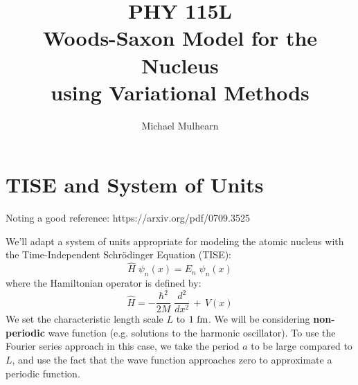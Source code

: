 \documentclass[12pt]{article}
\begin{document}
\newcommand{\ihbar}{\ensuremath{i \hbar}}
\newcommand{\Pss}{\ensuremath{\Psi^*}}
\newcommand{\dPsidt}{\ensuremath{ \frac{\partial \Psi}{\partial t} }}
\newcommand{\dPsidx}{\ensuremath{ \frac{\partial \Psi}{\partial x} }}
\newcommand{\ddPsidx}{\ensuremath{ \frac{\partial^2 \Psi}{\partial x^2} }}
\newcommand{\dPssdt}{\ensuremath{ \frac{\partial \Psi^*}{\partial t} }}
\newcommand{\dPssdx}{\ensuremath{ \frac{\partial \Psi^*}{\partial x} }}
\newcommand{\ddPssdx}{\ensuremath{ \frac{\partial^2 \Psi^*}{\partial x^2} }}

\newcommand{\dphidt}{\ensuremath{ \frac{d \phi}{dt} }}
\newcommand{\dpsidx}{\ensuremath{ \frac{d \psi}{dx} }}
\newcommand{\ddpsidx}{\ensuremath{ \frac{d^2 \psi}{dx^2} }}


\title{PHY 115L \\ Woods-Saxon Model for the Nucleus \\ using Variational Methods }
\author{Michael Mulhearn}

\maketitle

\section{TISE and System of Units}

Noting a good reference:  https://arxiv.org/pdf/0709.3525

\noindent
We'll adapt a system of units appropriate for modeling the atomic nucleus
with the Time-Independent
Schr\"odinger Equation (TISE):
$$\hat{H} \; \psi_n(x) = E_n \; \psi_n(x)$$
where the Hamiltonian operator is defined by:
\begin{equation}
\hat{H} = -\frac{\hbar^2}{2 M} \; \frac{d^2}{dx^2} \, + \, V(x)
\end{equation}
We set the characteristic length scale $L$ to $1~\rm fm$.
We will be considering {\bf non-periodic} wave function
(e.g. solutions to the harmonic oscillator).  To use the Fourier
series approach in this case, we take the period $a$ to be large
compared to $L$, and use the fact that the wave function approaches
zero to approximate a periodic function.
\end{document}
